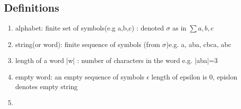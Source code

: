 \documentclass[11pt]{amsart}
\begin{document}
\subsection{Definitions}
\begin{enumerate}
  \item alphabet: finite set of symbols(e.g {a,b,c}) : denoted $\sigma$ as in
    $\sum{a,b,c}$
  \item string(or word): finite sequence of symbols (from $\sigma$)e.g. a, aba,
    cbca, abc
  \item length of a word |w| : number of characters in the word  e.g. |aba|=3
  \item empty word: an empty sequence of symbols $\epsilon$ length of epsilon
    is 0, epislon denotes empty string
  \item
\end{enumerate}
\end{document}
